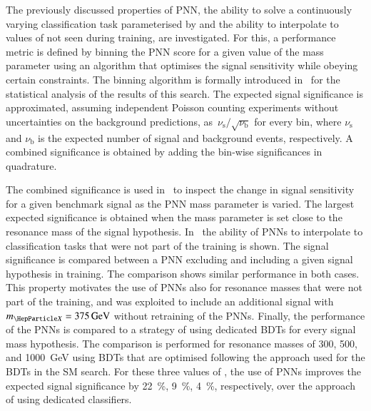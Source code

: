 The previously discussed properties of PNN, the ability to solve a continuously
varying classification task parameterised by \mX and the ability to interpolate
to values of \mX not seen during training, are investigated. For this, a
performance metric is defined by binning the PNN score for a given value of the
mass parameter using an algorithm that optimises the signal sensitivity while
obeying certain constraints. The binning algorithm is formally introduced
in~ for the statistical analysis of the results of this
search.
The expected signal significance is approximated, assuming independent Poisson
counting experiments without uncertainties on the background predictions,
as~$\nu_\text{s} / \sqrt{\nu_\text{b}}$ for every bin, where $\nu_\text{s}$ and
$\nu_\text{b}$ is the expected number of signal and background events,
respectively. A combined significance is obtained by adding the bin-wise
significances in quadrature.

The combined significance is used in~ to
inspect the change in signal sensitivity for a given benchmark signal
as the PNN mass parameter is varied. The largest expected significance
is obtained when the mass parameter is set close to the resonance mass
of the signal hypothesis.
In~ the ability of PNNs to interpolate to
classification tasks that were not part of the training is shown. The
signal significance is compared between a PNN excluding and including
a given signal hypothesis in training. The comparison shows similar
performance in both cases. This property motivates the use of PNNs
also for resonance masses that were not part of the training, and was
exploited to include an additional signal with $\mX = \SI{375}{\GeV}$
without retraining of the PNNs. %
Finally, the performance of the PNNs is compared to a strategy of
using dedicated BDTs for every signal mass hypothesis. The comparison
is performed for resonance masses of \num{300}, \num{500}, and
\SI{1000}{\GeV} using BDTs that are optimised following the approach
used for the BDTs in the SM \HH search. For these three values of \mX,
the use of PNNs improves the expected signal significance by
\SI{22}{\percent}, \SI{9}{\percent}, \SI{4}{\percent}, respectively,
over the approach of using dedicated classifiers.

